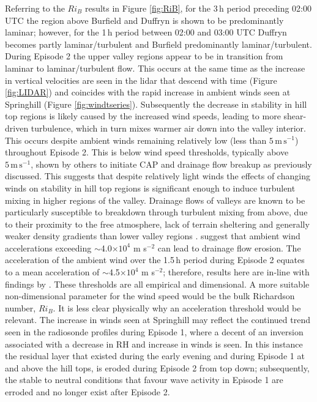 \documentclass[times]{qjrms4}
\begin{document}
Referring to the $Ri_{B}$ results in Figure \ref{fig:RiB}, for the 3$\,\mbox{h}$ period preceding 02:00 UTC the region above Burfield and Duffryn is shown to be predominantly laminar; however, for the 1$\,\mbox{h}$ period between 02:00 and 03:00 UTC Duffryn becomes partly laminar/turbulent and Burfield predominantly laminar/turbulent. During Episode 2 the upper valley regions appear to be in transition from laminar to laminar/turbulent flow. This occurs at the same time as the increase in vertical velocities are seen in the lidar that descend with time (Figure \ref{fig:LIDAR}) and coincides with the rapid increase in ambient winds seen at Springhill (Figure \ref{fig:windtseries}). Subsequently the decrease in stability in hill top regions is likely caused by the increased wind speeds, leading to more shear-driven turbulence, which in turn mixes warmer air down into the valley interior. This occurs despite ambient winds remaining relatively low (less than $5\,\mbox{m}\,\mbox{s}^{-1}$) throughout Episode 2. This is below wind speed thresholds, typically above $5\,\mbox{m}\,\mbox{s}^{-1}$, shown by others to initiate CAP and drainage flow breakup as previously discussed. This suggests that despite relatively light winds the effects of changing winds on stability in hill top regions is significant enough to induce turbulent mixing in higher regions of the valley. Drainage flows  of valleys are known to be particularly susceptible to breakdown through turbulent mixing from above, due to their proximity to the free atmosphere, lack of terrain sheltering and generally weaker density gradients than lower valley regions \citep{barr1989influence,gudiksen1992measurements}. \citet{orgill1992mesoscale} suggest that ambient wind accelerations exceeding $\sim$4.0$\times10^4$ m s$^{-2}$ can lead to drainage flow erosion. The acceleration of the ambient wind over the 1.5$\,\mbox{h}$ period during Episode 2 equates to a mean acceleration of $\sim$4.5$\times10^4$ m s$^{-2}$; therefore, results here are in-line with findings by \citet{orgill1992mesoscale}. These thresholds are all empirical and dimensional. A more suitable non-dimensional parameter for the wind speed would be the bulk Richardson number, $Ri_B$. It is less clear physically why an acceleration threshold would be relevant. The increase in winds seen at Springhill may reflect the continued trend seen in the radiosonde profiles during Episode 1, where a decent of an inversion associated with a decrease in RH and increase in winds is seen. In this instance the residual layer that existed during the early evening and during Episode 1 at and above the hill tops, is eroded during Episode 2 from top down; subsequently, the stable to neutral conditions that favour wave activity in Episode 1 are erroded and no longer exist after Episode 2.
\end{document}
